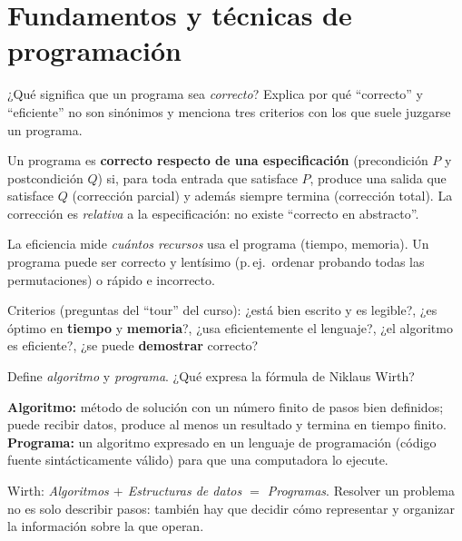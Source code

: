 \section{Fundamentos y técnicas de programación}

\begin{prob}
¿Qué significa que un programa sea \emph{correcto}? Explica por qué ``correcto'' y ``eficiente'' no son sinónimos y menciona tres criterios con los que suele juzgarse un programa.
\end{prob}
\begin{sol}
Un programa es \textbf{correcto respecto de una especificación} (precondición $P$ y postcondición $Q$) si, para toda entrada que satisface $P$, produce una salida que satisface $Q$ (corrección parcial) y además siempre termina (corrección total). La corrección es \emph{relativa} a la especificación: no existe ``correcto en abstracto''.

La eficiencia mide \emph{cuántos recursos} usa el programa (tiempo, memoria). Un programa puede ser correcto y lentísimo (p.\,ej.\ ordenar probando todas las permutaciones) o rápido e incorrecto.

Criterios (preguntas del ``tour'' del curso): ¿está bien escrito y es legible?, ¿es óptimo en \textbf{tiempo} y \textbf{memoria}?, ¿usa eficientemente el lenguaje?, ¿el algoritmo es eficiente?, ¿se puede \textbf{demostrar} correcto?
\end{sol}

\begin{prob}
Define \emph{algoritmo} y \emph{programa}. ¿Qué expresa la fórmula de Niklaus Wirth?
\end{prob}
\begin{sol}
\textbf{Algoritmo:} método de solución con un número finito de pasos bien definidos; puede recibir datos, produce al menos un resultado y termina en tiempo finito. \textbf{Programa:} un algoritmo expresado en un lenguaje de programación (código fuente sintácticamente válido) para que una computadora lo ejecute.

Wirth: \emph{Algoritmos $+$ Estructuras de datos $=$ Programas}. Resolver un problema no es solo describir pasos: también hay que decidir cómo representar y organizar la información sobre la que operan.
\end{sol}

